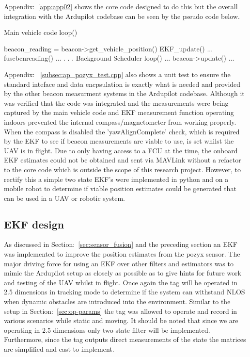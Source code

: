 Appendix:~\ref{app:app02} shows the core code designed to do this but the overall integration with the Ardupilot codebase can be seen by the pseudo code below.
\begin{algorithm}
    Main vehicle code
        loop()
        {
            beacon_reading = beacon->get_vehicle_position()
            EKF_update()
            {
                ...
                fusebcnreading()
                ...
            }
            .
            .
            .
    Background Scheduler
        loop()
        {
            ...
            beacon->update()
            ...
        }

        }
\end{algorithm}

Appendix: ~\ref{subsec:ap_pozyx_test.cpp} also shows a unit test to ensure the standard inteface and data encpsulation is exactly what is needed and provided by the other beacon measurment systems in the Ardupilot codebase.
Although it was verified that the code was integrated and the measurements were being captured by the main vehicle code and EKF measurement function operating indoors prevented the internal compass/magnetometer from working properly.
When the compass is disabled the 'yawAlignComplete' check, which is required by the EKF to see if beacon measurements are viable to use, is set whilst the UAV is in flight.
Due to only having access to a FCU at the time, the onboard EKF estimates could not be obtained and sent via MAVLink without a refactor to the core code which is outside the scope of this research project.
However, to rectify this a simple two state EKF's were implemented in python and on a mobile robot to determine if viable position estimates could be generated that can be used in a UAV or robotic system.

\subsection*{EKF design}
As discussed in Section:~\ref{sec:sensor_fusion} and the preceding section an EKF was implemented to improve the position estimates from the pozyx sensor.
The major driving force for using an EKF over other filters and estimators was to mimic the Ardupilot setup as closely as possible as to give hints for future work and testing of the UAV whilst in flight.
Once again the tag will be operated in 2.5 dimensions in tracking mode to determine if the system can withstand NLOS when dynamic obstacles are introduced into the environment.
Similar to the setup in Section:~\ref{sec:op-params} the tag was allowed to operate and record in various scenarios while static and moving.
It should be noted that since we are operating in 2.5 dimensions only two state filter will be implemented.
Furthermore, since the tag outputs direct measurements of the state the matrices are simplified and east to implement.


